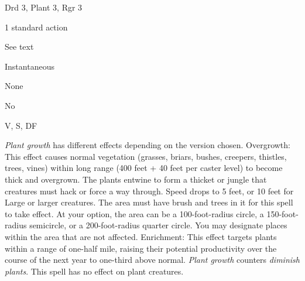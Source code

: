 
\begin{description*}
\item[Level:] Drd 3, Plant 3, Rgr 3
\item[Casting Time:] 1 standard action
\item[Range:] See text
\item[Duration:] Instantaneous
\item[Saving Throw:] None
\item[Spell Resistance:] No
\item[Components:] V, S, DF
\end{description*}

\textit{Plant growth} has different effects depending on the version chosen.
Overgrowth: This effect causes normal vegetation (grasses, briars, bushes,
creepers, thistles, trees, vines) within long range (400 feet + 40 feet per caster
level) to become thick and overgrown. The plants entwine to form a thicket or jungle
that creatures must hack or force a way through. Speed drops to 5 feet, or 10 feet
for Large or larger creatures. The area must have brush and trees in it for this
spell to take effect.
At your option, the area can be a 100-foot-radius circle, a 150-foot-radius semicircle,
or a 200-foot-radius quarter circle.
You may designate places within the area that are not affected.
Enrichment: This effect targets plants within a range of one-half mile,
raising their potential productivity over the course of the next year to one-third
above normal.
\textit{Plant growth} counters \textit{diminish plants}.
This spell has no effect on plant creatures.